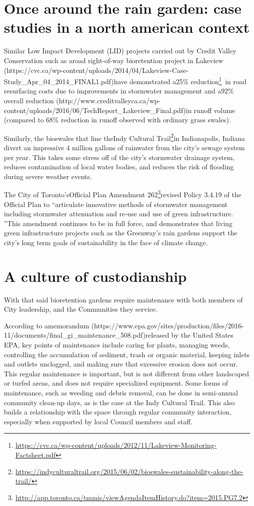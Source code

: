 \documentclass[letter]{ourGreenwayBrand}
\begin{document}
\section{Once around the rain garden: case studies in a north american context}
Similar Low Impact Development (LID) projects carried out by Credit Valley Conservation such as aroad right-of-way bioretention project in Lakeview (https://cvc.ca/wp-content/uploads/2014/04/Lakeview-Case-Study\_Apr\_04\_2014\_FINAL1.pdf)have demonstrated a25\% reduction\footnote{\url{https://cvc.ca/wp-content/uploads/2012/11/Lakeview-Monitoring-Factsheet.pdf}} in road resurfacing costs due to improvements in stormwater management and a92\% overall reduction (http://www.creditvalleyca.ca/wp-content/uploads/2016/06/TechReport\_Lakeview\_Final.pdf)in runoff volume (compared to 68\% reduction in runoff observed with ordinary grass swales).

Similarly, the bioswales that line theIndy Cultural Trail\footnote{\url{https://indyculturaltrail.org/2015/06/02/bioswales-sustainability-along-the-trail/}}in Indianapolis, Indiana divert an impressive 4 million gallons of rainwater from the city’s sewage system per year. This takes some stress off of the city’s stormwater drainage system, reduces contamination of local water bodies, and reduces the risk of flooding during severe weather events.

The City of Toronto’sOfficial Plan Amendment 262\footnote{\url{http://app.toronto.ca/tmmis/viewAgendaItemHistory.do?item=2015.PG7.2}}revised Policy 3.4.19 of the Official Plan to “articulate innovative methods of stormwater management including stormwater attenuation and re-use and use of green infrastructure. ”This amendment continues to be in full force, and demonstrates that living green infrastructure projects such as the Greenway’s rain gardens support the city’s long term goals of sustainability in the face of climate change.

\section{A culture of custodianship}
With that said bioretention gardens require maintenance with both members of City leadership, and the Communities they service.

According to amemorandum (https://www.epa.gov/sites/production/files/2016-11/documents/final\_gi\_maintenance\_508.pdf)released by the United States EPA, key points of maintenance include caring for plants, managing weeds, controlling the accumulation of sediment, trash or organic material, keeping inlets and outlets unclogged, and making sure that excessive erosion does not occur. This regular maintenance is important, but is not different from other landscaped or turfed areas, and does not require specialized equipment. Some forms of maintenance, such as weeding and debris removal, can be done in semi-annual community clean-up days, as is the case at the Indy Cultural Trail. This also builds a relationship with the space through regular community interaction, especially when supported by local Council members and staff.
\end{document}
